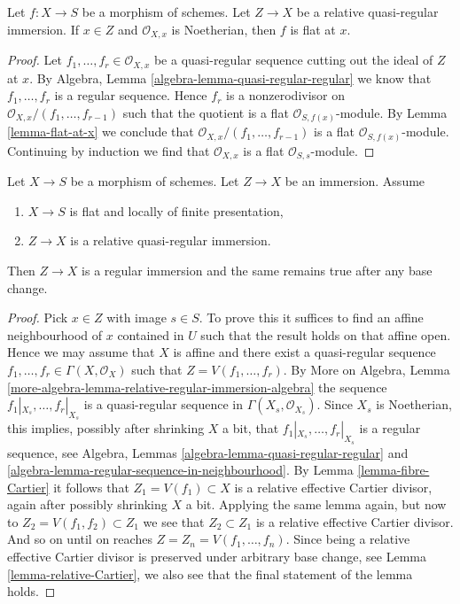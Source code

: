 \begin{lemma}
\label{lemma-quasi-regular-immersion-flat-at-x}
Let $f : X \to S$ be a morphism of schemes.
Let $Z \to X$ be a relative quasi-regular immersion.
If $x \in Z$ and $\mathcal{O}_{X, x}$ is Noetherian, then $f$ is flat at $x$.
\end{lemma}

\begin{proof}
Let $f_1, \ldots, f_r \in \mathcal{O}_{X, x}$ be a quasi-regular
sequence cutting out the ideal of $Z$ at $x$. By
Algebra, Lemma \ref{algebra-lemma-quasi-regular-regular}
we know that $f_1, \ldots, f_r$ is a regular sequence.
Hence $f_r$ is a nonzerodivisor on
$\mathcal{O}_{X, x}/(f_1, \ldots, f_{r - 1})$ such that the
quotient is a flat $\mathcal{O}_{S, f(x)}$-module.
By
Lemma \ref{lemma-flat-at-x}
we conclude that $\mathcal{O}_{X, x}/(f_1, \ldots, f_{r - 1})$
is a flat $\mathcal{O}_{S, f(x)}$-module.
Continuing by induction we find that $\mathcal{O}_{X, x}$
is a flat $\mathcal{O}_{S, s}$-module.
\end{proof}

\begin{lemma}
\label{lemma-relative-regular-immersion-flat-in-neighbourhood}
Let $X \to S$ be a morphism of schemes.
Let $Z \to X$ be an immersion.
Assume
\begin{enumerate}
\item $X \to S$ is flat and locally of finite presentation,
\item $Z \to X$ is a relative quasi-regular immersion.
\end{enumerate}
Then $Z \to X$ is a regular immersion and
the same remains true after any base change.
\end{lemma}

\begin{proof}
Pick $x \in Z$ with image $s \in S$. To prove this it suffices to
find an affine neighbourhood of $x$ contained in $U$ such that the
result holds on that affine open. Hence we may assume that $X$ is affine
and there exist a quasi-regular sequence
$f_1, \ldots, f_r \in \Gamma(X, \mathcal{O}_X)$
such that $Z = V(f_1, \ldots, f_r)$. By
More on Algebra, Lemma
\ref{more-algebra-lemma-relative-regular-immersion-algebra}
the sequence $f_1|_{X_s}, \ldots, f_r|_{X_s}$ is a
quasi-regular sequence in $\Gamma(X_s, \mathcal{O}_{X_s})$.
Since $X_s$ is Noetherian, this implies, possibly after shrinking
$X$ a bit, that $f_1|_{X_s}, \ldots, f_r|_{X_s}$ is a regular
sequence, see
Algebra, Lemmas \ref{algebra-lemma-quasi-regular-regular} and
\ref{algebra-lemma-regular-sequence-in-neighbourhood}.
By
Lemma \ref{lemma-fibre-Cartier}
it follows that $Z_1 = V(f_1) \subset X$ is a relative effective
Cartier divisor, again after possibly shrinking $X$ a bit.
Applying the same lemma again, but now to $Z_2 = V(f_1, f_2) \subset Z_1$
we see that $Z_2 \subset Z_1$ is a relative effective Cartier divisor.
And so on until on reaches $Z = Z_n = V(f_1, \ldots, f_n)$.
Since being a relative effective Cartier divisor is preserved under
arbitrary base change, see
Lemma \ref{lemma-relative-Cartier},
we also see that the final statement of the lemma holds.
\end{proof}


